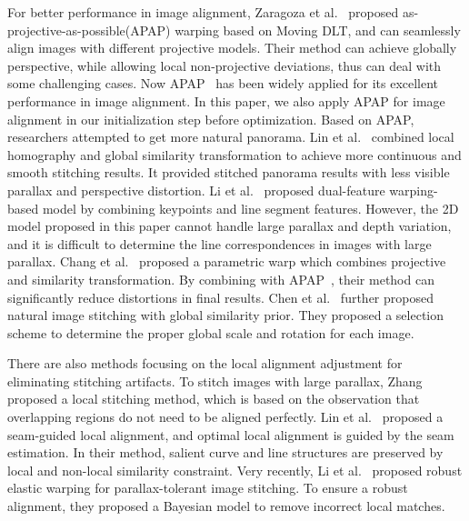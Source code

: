 \documentclass[10pt,journal,compsoc]{IEEEtran}
\begin{document}
For better performance in image alignment, Zaragoza et al.~\cite{journals/pami/ZaragozaCTBS14} proposed as-projective-as-possible(APAP) warping based on Moving DLT, and can seamlessly align images with different projective models. Their method can achieve globally perspective, while allowing local non-projective deviations, thus can deal with some challenging cases. Now APAP~\cite{journals/pami/ZaragozaCTBS14}  has been widely applied for its excellent performance in image alignment. In this paper, we also apply APAP for image alignment in our initialization step before optimization.
Based on APAP, researchers attempted to get more natural panorama. Lin et al.~\cite{conf/CVPR/LinPRA15} combined local homography and global similarity transformation to achieve more continuous and smooth stitching results. It provided stitched panorama results with less visible parallax and perspective distortion.
Li et al.~\cite{conf/ICCV/LiY0Q15} proposed dual-feature warping-based model by combining keypoints and line segment features. However, the 2D model proposed in this paper cannot handle large parallax and depth variation, and it is difficult to determine the line correspondences in images with large parallax.
Chang et al.~\cite{conf/cvpr/ChangSC14} proposed a parametric warp which combines projective and similarity transformation. By combining with APAP~\cite{journals/pami/ZaragozaCTBS14}, their method can significantly reduce  distortions in final results.
Chen et al.~\cite{conf/eccv/ChenC16} further proposed natural image stitching with global similarity prior. They proposed a selection scheme to determine the proper global scale and rotation for each image. 

There are also methods focusing on the local alignment adjustment for eliminating stitching artifacts.
To stitch images with large parallax, Zhang~\cite{conf/cvpr/ZhangL14a} proposed a local stitching method, which is based on the observation that overlapping regions do not need to be aligned perfectly. Lin et al.~\cite{conf/eccv/LinJCDL16} proposed a seam-guided local alignment, and optimal local alignment is guided by the seam estimation.
In their method, salient curve and line structures are preserved by local and non-local similarity constraint.
Very recently, Li et al.~\cite{journals/tmm/LiWLZZ18} proposed robust elastic warping for parallax-tolerant image stitching. To ensure a robust alignment, they proposed a Bayesian model to remove incorrect local matches. 
\end{document}
